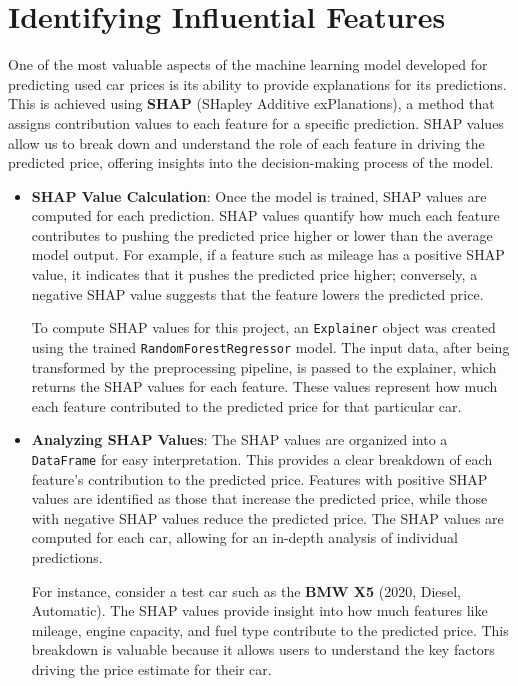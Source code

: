 \documentclass[a4paper,12pt]{article}
\begin{document}
\section{Identifying Influential Features}
\begin{justify}
	One of the most valuable aspects of the machine learning model developed for predicting used car prices is its ability to provide explanations for its predictions. This is achieved using \textbf{SHAP} (SHapley Additive exPlanations), a method that assigns contribution values to each feature for a specific prediction. SHAP values allow us to break down and understand the role of each feature in driving the predicted price, offering insights into the decision-making process of the model.
	
	\begin{itemize}
		\item \textbf{SHAP Value Calculation}:
		Once the model is trained, SHAP values are computed for each prediction. SHAP values quantify how much each feature contributes to pushing the predicted price higher or lower than the average model output. For example, if a feature such as mileage has a positive SHAP value, it indicates that it pushes the predicted price higher; conversely, a negative SHAP value suggests that the feature lowers the predicted price.
		
		To compute SHAP values for this project, an \texttt{Explainer} object was created using the trained \texttt{RandomForestRegressor} model. The input data, after being transformed by the preprocessing pipeline, is passed to the explainer, which returns the SHAP values for each feature. These values represent how much each feature contributed to the predicted price for that particular car.
		
		\item \textbf{Analyzing SHAP Values}:
		The SHAP values are organized into a \texttt{DataFrame} for easy interpretation. This provides a clear breakdown of each feature’s contribution to the predicted price. Features with positive SHAP values are identified as those that increase the predicted price, while those with negative SHAP values reduce the predicted price. The SHAP values are computed for each car, allowing for an in-depth analysis of individual predictions.
		
		For instance, consider a test car such as the \textbf{BMW X5} (2020, Diesel, Automatic). The SHAP values provide insight into how much features like mileage, engine capacity, and fuel type contribute to the predicted price. This breakdown is valuable because it allows users to understand the key factors driving the price estimate for their car.
		

\end{itemize}
\end{justify}
\end{document}
